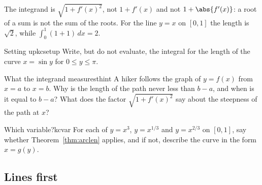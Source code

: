 \documentclass[11pt]{article}
\begin{document}
\begin{warn}
The integrand is $\sqrt{1+f'(x)^2}$, not $1+f'(x)$ and not $1+\abs{f'(x)}$: a root of a sum is not the sum of the roots. For the line $y=x$ on $[0,1]$ the length is $\sqrt2$, while $\int_0^1(1+1)\,dx=2$.
\end{warn}

\begin{kc}{Setting up}{kcsetup}
Write, but do not evaluate, the integral for the length of the curve $x=\sin y$ for $0\le y\le\pi$.
\end{kc}

\begin{think}{What the integrand measures}{thint}
A hiker follows the graph of $y=f(x)$ from $x=a$ to $x=b$. Why is the length of the path never less than $b-a$, and when is it equal to $b-a$? What does the factor $\sqrt{1+f'(x)^2}$ say about the steepness of the path at $x$?
\end{think}

\begin{kc}{Which variable?}{kcvar}
For each of $y=x^3$, $y=x^{1/3}$ and $y=x^{2/3}$ on $[0,1]$, say whether Theorem~\ref{thm:arclen} applies, and if not, describe the curve in the form $x=g(y)$.
\end{kc}

\subsection*{Lines first}
\end{document}
